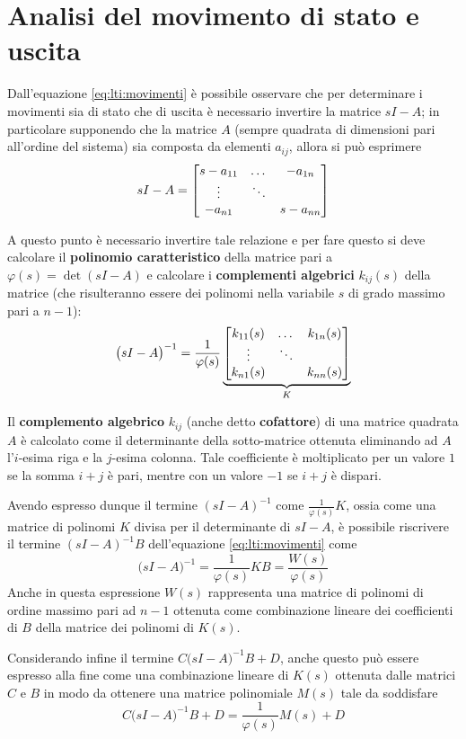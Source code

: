 \section{Analisi del movimento di stato e uscita} \label{sec:lti:studiomovimenti}
	Dall'equazione \ref{eq:lti:movimenti} è possibile osservare che per determinare i movimenti sia di stato che di uscita è necessario invertire la matrice $sI - A$; in particolare supponendo che la matrice $A$ (sempre quadrata di dimensioni pari all'ordine del sistema) sia composta da elementi $a_{ij}$, allora si può esprimere 
	\[ sI - A = \begin{bmatrix} s - a_{11} & \dots & -a_{1n} \\ \vdots & \ddots \\ -a_{n1} & & s-a_{nn}  \end{bmatrix}   \]
	
	A questo punto è necessario invertire tale relazione e per fare questo si deve calcolare il \textbf{polinomio caratteristico} della matrice pari a $\varphi(s) = \det(sI-A)$ e calcolare i \textbf{complementi algebrici} $k_{ij}(s)$ della matrice (che risulteranno essere dei polinomi nella variabile $s$ di grado massimo pari a $n-1$):
	\[\big(sI-A\big) ^{-1} = \frac 1 {\varphi(s)} \underbrace{\begin{bmatrix} k_{11}(s) & \dots & k_{1n}(s) \\ \vdots & \ddots \\ k_{n1}(s) & & k_{nn}(s)  \end{bmatrix}}_K \]
	
	\begin{richiamo}
		Il \textbf{complemento algebrico} $k_{ij}$ (anche detto \textbf{cofattore}) di una matrice quadrata $A$ è calcolato come il determinante della sotto-matrice ottenuta eliminando ad $A$ l'$i$-esima riga e la $j$-esima colonna. Tale coefficiente è moltiplicato per un valore $1$ se la somma $i+j$ è pari, mentre con un valore $-1$ se $i+j$ è dispari.
	\end{richiamo}
	Avendo espresso dunque il termine $(sI-A)^{-1}$ come $\frac 1 {\varphi(s)} K$, ossia come una matrice di polinomi $K$ divisa per il determinante di $sI-A$, è possibile riscrivere il termine $(sI-A)^{-1} B $ dell'equazione \ref{eq:lti:movimenti} come
	\[  \big(sI-A\big)^{-1} = \frac 1 {\varphi(s)} KB = \frac{W(s)}{\varphi(s)} \]
	Anche in questa espressione $W(s)$ rappresenta una matrice di polinomi di ordine massimo pari ad $n-1$ ottenuta come combinazione lineare dei coefficienti di $B$ della matrice dei polinomi di $K(s)$.
	
	Considerando infine il termine $C\big(sI-A\big)^{-1}B + D$, anche questo può essere espresso alla fine come una combinazione lineare di $K(s)$ ottenuta dalle matrici $C$ e $B$ in modo da ottenere una matrice polinomiale $M(s)$ tale da soddisfare
	\[ C\big(sI-A\big)^{-1}B + D = \frac 1 {\varphi(s)} M(s) + D \]
	
